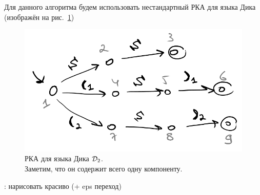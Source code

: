 \begin{note}    
  Для данного алгоритма будем использовать нестандартный РКА для языка Дика (изображён на рис.~\ref{img:dyck_rsm})

  \begin{figure}[H]
      \includegraphics[width=0.75\linewidth]{img/dyck_rsm}
      \caption{РКА для языка Дика $\mathcal{D}_2$.\\ Заметим, что он содержит всего одну компоненту.}
      \label{img:dyck_rsm}
  \end{figure}

  \TODO: нарисовать красиво (+ eps переход)

\end{note}


